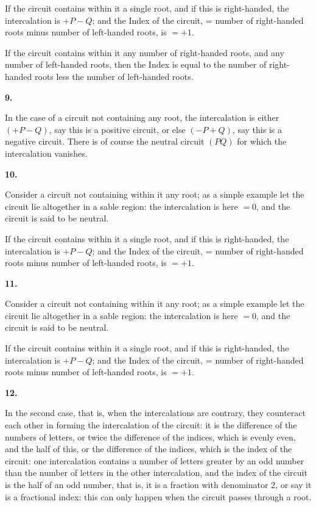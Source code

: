 \documentclass[11pt,a4paper]{book}
\begin{document}
If the circuit contains within it a single root, and if this is right-handed, the intercalation is $+P - Q$; and the Index of the circuit, = number of right-handed roots minus number of left-handed roots, is $= +1$.

If the circuit contains within it any number of right-handed roots, and any number of left-handed roots, then the Index is equal to the number of right-handed roots less the number of left-handed roots.

\textbf{9.}

In the case of a circuit not containing any root, the intercalation is either $(+P - Q)$, say this is a positive circuit, or else $(-P + Q)$, say this is a negative circuit. There is of course the neutral circuit $(PQ)$ for which the intercalation vanishes.

\textbf{10.}

Consider a circuit not containing within it any root; as a simple example let the circuit lie altogether in a sable region: the intercalation is here $= 0$, and the circuit is said to be neutral.

If the circuit contains within it a single root, and if this is right-handed, the intercalation is $+P - Q$; and the Index of the circuit, = number of right-handed roots minus number of left-handed roots, is $= +1$.

\newpage
\setcounter{page}{25}

\textbf{11.}

Consider a circuit not containing within it any root; as a simple example let the circuit lie altogether in a sable region: the intercalation is here $= 0$, and the circuit is said to be neutral.

If the circuit contains within it a single root, and if this is right-handed, the intercalation is $+P - Q$; and the Index of the circuit, = number of right-handed roots minus number of left-handed roots, is $= +1$.

\textbf{12.}

In the second case, that is, when the intercalations are contrary, they counteract each other in forming the intercalation of the circuit: it is the difference of the numbers of letters, or twice the difference of the indices, which is evenly even, and the half of this, or the difference of the indices, which is the index of the circuit: one intercalation contains a number of letters greater by an odd number than the number of letters in the other intercalation, and the index of the circuit is the half of an odd number, that is, it is a fraction with denominator 2, or say it is a fractional index: this can only happen when the circuit passes through a root.
\end{document}
